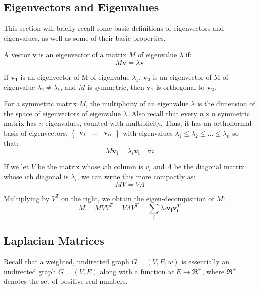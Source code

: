 \subsection{Eigenvectors and Eigenvalues}
This section will briefly recall some basic definitions of eigenvectors and
eigenvalues, as well as some of their basic properties.

A vector $\mathbf{v}$ is an eigenvector of a matrix $M$ of eigenvalue $\lambda$ 
if:
\begin{displaymath}
M\mathbf{v} = \lambda\textbf{v}
\end{displaymath}

If $\mathbf{v_{1}}$ is an eigenvector of M of eigenvalue $\lambda_{1}$, 
$\mathbf{v_{2}}$ is an eigenvector of M of eigenvalue $\lambda_{2} \neq 
\lambda_{1}$, and $M$ is symmetric, then $\mathbf{v_{1}}$ is orthogonal to 
$\mathbf{v_{2}}$.

For a symmetric matrix $M$, the multiplicity of an eigenvalue $\lambda$ is the
dimension of the space of eigenvectors of eigenvalue $\lambda$. Also recall that
every $n{\times}n$ symmetric matrix has $n$ eigenvalues, counted with 
multiplicity. Thus, it has an orthonormal basis of eigenvectors, 
$\begin{Bmatrix} \mathbf{v_{1}} & \ldots & \mathbf{v_{n}} \end{Bmatrix}$ with
eigenvalues $\lambda_{1} \leq \lambda_{2} \leq \ldots \leq \lambda_{n}$ so that:
\begin{displaymath}
M\mathbf{v_{i}} = \lambda_{i}\mathbf{v_{i}} \quad \forall i
\end{displaymath}

If we let $V$ be the matrix whose $i$th column is $v_{i}$ and $\Lambda$ be the 
diagonal matrix whose $i$th diagonal is $\lambda_{i}$, we can write this more 
compactly as:
\begin{displaymath}
MV = V\Lambda
\end{displaymath}

Multiplying by $V^{T}$ on the right, we obtain the eigen-decompisition of $M$:
\begin{displaymath}
M = MVV^{T} = V{\Lambda}V^{T} = \sum_{i} \lambda_{i}\mathbf{v_{i}}\mathbf{v_{i}^{T}}
\end{displaymath}

\subsection{Laplacian Matrices}
\nocite{BERKEYLEY99}
\nocite{PATI11}
\nocite{SPIELMAN09}
Recall that a weighted, undirected graph $G = (V,E,w)$ is essentially an 
undirected graph $G = (V,E)$ along with a function $w : E \rightarrow 
\Re^{+}$, where $\Re^{+}$ denotes the set of positive real numbers.

